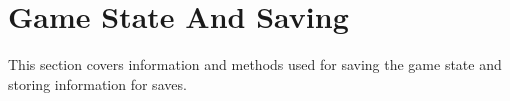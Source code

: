 \section{Game State And Saving}

This section covers information and methods used for saving the game state and storing information for saves.












